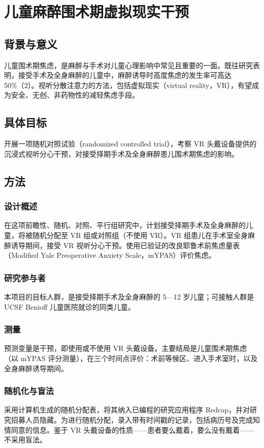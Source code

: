 \section{儿童麻醉围术期虚拟现实干预}
\subsection{背景与意义}
儿童围术期焦虑，是麻醉与手术对儿童心理影响中常见且重要的一面。既往研究表明，接受手术及全身麻醉的儿童中，麻醉诱导时高度焦虑的发生率可高达 50\%（2）。视听分散注意力的方法，包括虚拟现实（virtual reality，VR），有望成为安全、无创、非药物性的减轻焦虑手段。

\subsection{具体目标}
开展一项随机对照试验（randomized controlled trial），考察 VR 头戴设备提供的沉浸式视听分心干预，对接受择期手术及全身麻醉患儿围术期焦虑的影响。

\subsection{方法}
\subsubsection{设计概述}
在这项前瞻性、随机、对照、平行组研究中，计划接受择期手术及全身麻醉的儿童，将被随机分配至 VR 组或对照组（不使用 VR）。VR 组患儿在手术室全身麻醉诱导期间，接受 VR 视听分心干预。使用已验证的改良耶鲁术前焦虑量表（Modified Yale Preoperative Anxiety Scale，mYPAS）评价焦虑。

\subsubsection{研究参与者}
本项目的目标人群，是接受择期手术及全身麻醉的 5—12 岁儿童；可接触人群是 UCSF Benioff 儿童医院就诊的同类儿童。

\subsubsection{测量}
预测变量是干预，即使用或不使用 VR 头戴设备。主要结局是儿童围术期焦虑（以 mYPAS 评分测量），在三个时间点评价：术前等候区、进入手术室时，以及全身麻醉诱导期间。

\subsubsection{随机化与盲法}
采用计算机生成的随机分配表，将其纳入已编程的研究应用程序 Redcap，并对研究招募人员隐藏。为进行随机分配，录入带有时间戳的记录，包括病历号及完成知情同意的信息。鉴于 VR 头戴设备的性质——患者要么戴着，要么没有戴着——不采用盲法。

